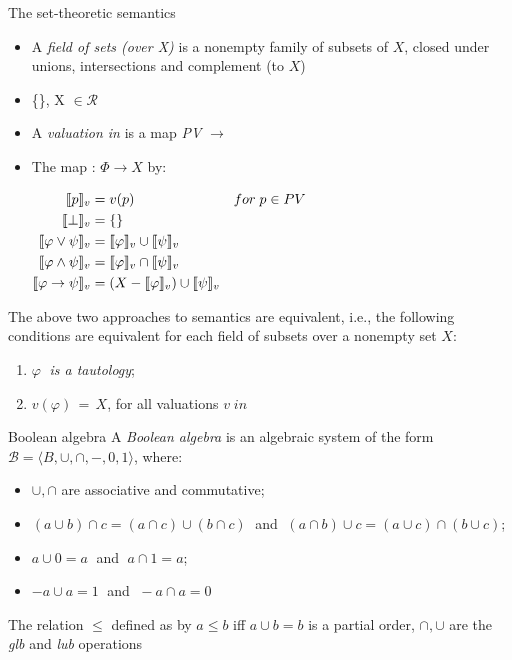 \documentclass[sans]{beamer}
\begin{document}
\begin{frame}{The set-theoretic semantics}
  \begin{itemize}
    \item A \emph{field of sets (over X)} is a nonempty family \calr
      of subsets of $X$, closed under unions, intersections and complement (to $X$)
    
    \item \{\}, X $\in \mathcal{R}$
    
    \item A \emph{valuation in} \calr is a map \emph{PV} $\to$ \calr
      
    \vfill

    \item The map \vmsem{\bullet} : $\Phi \to X$ by:

      $\begin{aligned}
        \llbracket p \rrbracket_v &= v(p) & for \; p \in PV \\
        \llbracket \bot \rrbracket_v &= \{\} \\
        \llbracket \varphi \vee \psi \rrbracket_v &= \llbracket \varphi \rrbracket_v \cup \llbracket \psi \rrbracket_v \\
        \llbracket \varphi \wedge \psi \rrbracket_v &= \llbracket \varphi \rrbracket_v \cap \llbracket \psi \rrbracket_v\\
        \llbracket \varphi \to \psi \rrbracket_v &= (X - \llbracket \varphi \rrbracket_v) \cup \llbracket \psi \rrbracket_v
       \end{aligned}$
  \end{itemize}
\end{frame}

\begin{frame}{}
  The above two approaches to semantics are equivalent, i.e., the following conditions
  are equivalent for each field of subsets \calr over a nonempty set $X$:
  \begin{enumerate}
    \item $\varphi \;$ \emph{is a tautology};
    \item $v(\varphi) \,=\, X$, for all valuations $v \; in \; $\calr
  \end{enumerate}
\end{frame}

\begin{frame}{Boolean algebra}
  A \emph{Boolean algebra} is an algebraic system of the form
  $\mathcal{B} = \langle B, \cup, \cap, -, 0, 1\rangle$, where:
  \begin{itemize}
    \item $\cup, \cap$ are associative and commutative;
    \item $(a \cup b) \cap c = (a \cap c) \cup (b \cap c) \;$ and
          $\; (a \cap b) \cup c = (a \cup c) \cap (b \cup c)$;
    \item $a \cup 0 = a \;$ and $\; a \cap 1 = a$;
    \item $-a \cup a = 1 \;$ and $\; -a \cap a = 0\;$
  \end{itemize}

  \vfill
  
  The relation $\leq$ defined as by $a \leq b$ iff $a \cup b = b$ is a partial order,
  $\cap, \cup$ are the \emph{glb} and \emph{lub} operations
\end{frame} 
\end{document}
